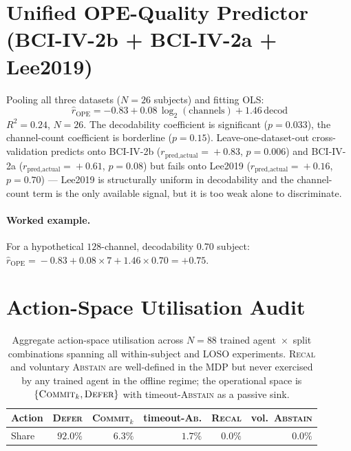 \documentclass[conference]{IEEEtran}
\newcommand{\bcia}{BCI-IV-2a}
\newcommand{\bcib}{BCI-IV-2b}
\begin{document}
\section{Unified OPE-Quality Predictor (\bcib{} + \bcia{} + Lee2019)}

Pooling all three datasets ($N\!=\!26$ subjects) and fitting OLS:
\[
\hat r_{\text{OPE}} = -0.83 + 0.08\,\log_2(\text{channels}) + 1.46\,\text{decod}
\]
$R^2\!=\!0.24$, $N\!=\!26$. The decodability coefficient is
significant ($p\!=\!0.033$), the channel-count coefficient is
borderline ($p\!=\!0.15$). Leave-one-dataset-out cross-validation
predicts onto \bcib{} ($r_{\text{pred,actual}}\!=\!+0.83$,
$p\!=\!0.006$) and \bcia{}
($r_{\text{pred,actual}}\!=\!+0.61$, $p\!=\!0.08$) but fails onto
Lee2019 ($r_{\text{pred,actual}}\!=\!+0.16$, $p\!=\!0.70$) ---
Lee2019 is structurally uniform in decodability and the channel-count
term is the only available signal, but it is too weak alone to
discriminate.

\paragraph{Worked example.}
For a hypothetical $128$-channel, decodability $0.70$ subject:
$\hat r_{\text{OPE}}\!=\!-0.83 + 0.08 \times 7 + 1.46 \times 0.70 = +0.75$.

\section{Action-Space Utilisation Audit}

\begin{table}[h]
\centering
\caption{Aggregate action-space utilisation across $N\!=\!88$
trained agent~$\times$~split combinations spanning all within-subject
and LOSO experiments. \textsc{Recal} and voluntary
\textsc{Abstain} are well-defined in the MDP but never exercised by
any trained agent in the offline regime; the operational space is
$\{\textsc{Commit}_k, \textsc{Defer}\}$ with timeout-\textsc{Abstain}
as a passive sink.}
\label{tab:sup:action_audit}
\footnotesize
\begin{tabular}{l r r r r r}
\toprule
Action  & \textsc{Defer} & \textsc{Commit}$_k$ & timeout-\textsc{Ab.} & \textsc{Recal} & vol.\ \textsc{Abstain} \\
\midrule
Share   & $92.0\%$ & $6.3\%$ & $1.7\%$ & $0.0\%$ & $0.0\%$ \\
\bottomrule
\end{tabular}
\end{table}
\end{document}
